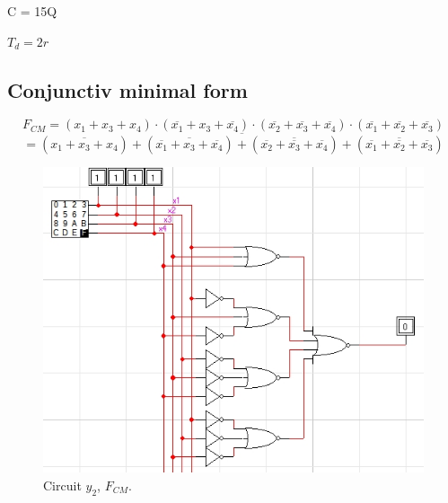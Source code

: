 \documentclass{article}
\begin{document}
			\begin{center}
				\par C = 15Q
				\par $T_d = 2r$
			\end{center}
			\pagebreak

		\newpage
		\subsection{Conjunctiv minimal form} %
			\[
				\textbf{$F_{CM}$} =
					(x_1 + x_3 + x_4) \cdot
					(\overline{x_1} + x_3 + \overline{x_4}) \cdot
					(\overline{x_2} + \overline{x_3} + \overline{x_4}) \cdot
					(\overline{x_1} + \overline{x_2} + \overline{x_3})
			\]
			\[
				= \overline{
					(\overline{x_1 + x_3 + x_4}) +
					(\overline{\overline{x_1} + x_3 + \overline{x_4}}) +
					(\overline{\overline{x_2} + \overline{x_3} + \overline{x_4}}) +
					(\overline{\overline{x_1} + \overline{x_2} + \overline{x_3}})
				}
			\]

			\begin{center} \begin{figure}[!ht]
				\begin{mdframed} \begin{center}
					\includegraphics[scale=0.5]{./imgs/Circuit1_FCM_ex2.jpg}
					\caption{Circuit $y_2$, $F_{CM}$.}
				\end{center} \end{mdframed}
				\label{fig:circuit_y2_fcm}
			\end{figure} \end{center}
		
\end{document}

